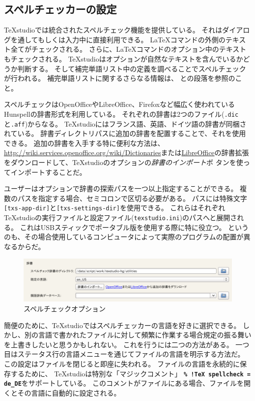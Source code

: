 \subsection{スペルチェッカーの設定}

TeXstudioでは統合されたスペルチェック機能を提供している。
それはダイアログを通してもしくは入力中に直接利用できる。
LaTeXコマンドの外側のテキスト全てがチェックされる。
さらに、LaTeXコマンドのオプション中のテキストもチェックされる。
TeXstudioはオプションが自然なテキストを含んでいるかどうか判断する。
そして補完単語リスト中の定義を調べることでスペルチェックが行われる。
補完単語リストに関するさらなる情報は、
との段落を参照のこと。

スペルチェックはOpenOfficeやLibreOffice、Firefoxなど幅広く使われているHunspellの辞書形式を利用している。
それぞれの辞書は2つのファイル(\verb+.dic+と\verb+.aff+)からなる。
TeXstudioにはフランス語、英語、ドイツ語の辞書が同梱されている。
辞書ディレクトリパスに追加の辞書を配置することで、それを使用できる。
追加の辞書を入手する特に便利な方法は、\href{http://extensions.openoffice.org/}{http://wiki.services.openoffice.org/wiki/Dictionaries}または\href{http://extensions.libreoffice.org/extension-center?getCategories=Dictionary}{LibreOffice}の辞書拡張をダウンロードして、TeXstudioのオプションの\emph{辞書のインポート}ボ
タンを使ってインポートすることだ。

ユーザーはオプションで辞書の探索パスを一つ以上指定することができる。
複数のパスを指定する場合、セミコロンで区切る必要がある。
パスには特殊文字\verb+[txs-app-dir]+と\verb+[txs-settings-dir]+を使用できる。
これらはそれぞれTeXstudioの実行ファイルと設定ファイル(\verb+texstudio.ini+)のパスへと展開される。
これはUSBスティックでポータブル版を使用する際に特に役立つ。
というのも、その場合使用しているコンピュータによって実際のプログラムの配置が異なるからだ。

\begin{figure}[H]
  \centering
  \includegraphics[width=.8\linewidth]{spellcheck_options.png}
  \caption{スペルチェックオプション}
\end{figure}

簡便のために、TeXstudioではスペルチェッカーの言語を好きに選択できる。
しかし、別の言語で書かれたファイルに対して頻繁に作業する場合規定の振る舞いを上書きしたいと思うかもしれない。
これを行うには二つの方法がある。
一つ目はステータス行の言語メニューを通じてファイルの言語を明示する方法だ。
この設定はファイルを閉じると即座に失われる。
ファイルの言語を永続的に保存するために、
TeXstudioは特別な「マジックコメント」
\textbf{\texttt{\% !TeX spellcheck = de\_DE}}をサポートしている。
このコメントがファイルにある場合、ファイルを開くとその言語に自動的に設定される。

